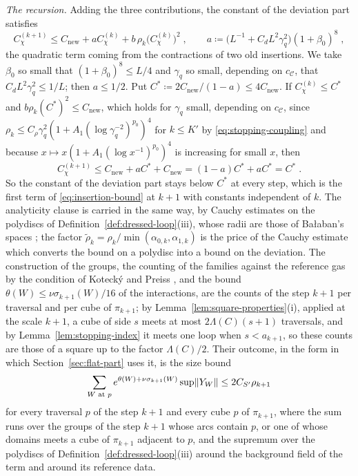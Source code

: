 \documentclass[11pt]{preprint}
\DeclarePairedDelimiter{\norm}{\lVert}{\rVert}
\numberwithin{equation}{section}
\theoremstyle{definition}
\theoremstyle{remark}
\theoremstyle{plain}
\begin{document}
\emph{The recursion.} Adding the three contributions, the constant of the deviation part satisfies
\begin{equation}\label{eq:deviation-recursion}
    C^{(k+1)}_\chi \leq C_{\mathrm{new}} + aC^{(k)}_\chi + b\,\rho_k\bigl(C^{(k)}_\chi\bigr)^2\;,
    \qquad
    a \coloneqq \bigl(L^{-1} + C_dL^2\gamma_q^2\bigr)(1 + \beta_0)^8\;,
\end{equation}
the quadratic term coming from the contractions of two old insertions. We take $\beta_0$ so small that $(1 + \beta_0)^8 \leq L/4$ and $\gamma_q$ so small, depending on $c_{\mathcal C}$, that $C_dL^2\gamma_q^2 \leq 1/L$; then $a \leq 1/2$. Put $C^* \coloneqq 2C_{\mathrm{new}}/(1 - a) \leq 4C_{\mathrm{new}}$. If $C^{(k)}_\chi \leq C^*$ and $b\rho_k(C^*)^2 \leq C_{\mathrm{new}}$, which holds for $\gamma_q$ small, depending on $c_{\mathcal C}$, since $\rho_k \leq C_\rho\gamma_q^2(1 + A_1(\log\gamma_q^{-2})^{p_0})^4$ for $k \leq K'$ by \eqref{eq:stopping-coupling} and because $x \mapsto x(1 + A_1(\log x^{-1})^{p_0})^4$ is increasing for small $x$, then
\begin{equation}\label{eq:recursion-fixed-point}
    C^{(k+1)}_\chi \leq C_{\mathrm{new}} + aC^* + C_{\mathrm{new}} = (1 - a)C^* + aC^* = C^*\;.
\end{equation}
So the constant of the deviation part stays below $C^*$ at every step, which is the first term of \eqref{eq:insertion-bound} at $k + 1$ with constants independent of $k$. The analyticity clause is carried in the same way, by Cauchy estimates on the polydiscs of Definition~\ref{def:dressed-loop}(iii), whose radii are those of Ba{\l}aban's spaces \cite[(2.34)--(2.39), p.~261]{BalabanCRE}; the factor $\tilde\rho_k = \rho_k/\min(\alpha_{0,k}, \alpha_{1,k})$ is the price of the Cauchy estimate which converts the bound on a polydisc into a bound on the deviation. The construction of the groups, the counting of the families against the reference gas by the condition of Koteck\'y and Preiss \cite{KoteckyPreiss}, and the bound $\theta(W) \leq \nu\sigma_{k+1}(W)/16$ of the interactions, are the counts of the step $k + 1$ per traversal and per cube of $\pi_{k+1}$; by Lemma~\ref{lem:square-properties}(i), applied at the scale $k + 1$, a cube of side $s$ meets at most $2\Lambda(C)(s + 1)$ traversals, and by Lemma~\ref{lem:stopping-index} it meets one loop when $s < a_{k+1}$, so these counts are those of a square up to the factor $\Lambda(C)/2$. Their outcome, in the form in which Section~\ref{sec:flat-part} uses it, is the size bound
\begin{equation}\label{eq:size-bound}
    \sum_{W \text{ at } p}e^{\theta(W) + \nu\sigma_{k+1}(W)}\sup\norm{Y_W} \leq 2C_{S'}\rho_{k+1}
\end{equation}
for every traversal $p$ of the step $k + 1$ and every cube $p$ of $\pi_{k+1}$, where the sum runs over the groups of the step $k + 1$ whose arcs contain $p$, or one of whose domains meets a cube of $\pi_{k+1}$ adjacent to $p$, and the supremum over the polydiscs of Definition~\ref{def:dressed-loop}(iii) around the background field of the term and around its reference data.
\end{document}
